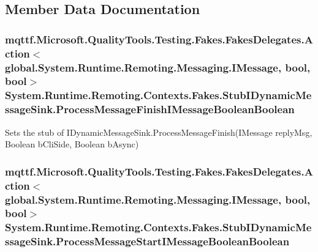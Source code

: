 \subsection{Member Data Documentation}
\hypertarget{class_system_1_1_runtime_1_1_remoting_1_1_contexts_1_1_fakes_1_1_stub_i_dynamic_message_sink_a06da6edaec8621edfd6fde49ad38520b}{
\subsubsection[{Process\-Message\-Finish\-I\-Message\-Boolean\-Boolean}]{\setlength{\rightskip}{0pt plus 5cm}mqttf.\-Microsoft.\-Quality\-Tools.\-Testing.\-Fakes.\-Fakes\-Delegates.\-Action$<$global.\-System.\-Runtime.\-Remoting.\-Messaging.\-I\-Message, bool, bool$>$ System.\-Runtime.\-Remoting.\-Contexts.\-Fakes.\-Stub\-I\-Dynamic\-Message\-Sink.\-Process\-Message\-Finish\-I\-Message\-Boolean\-Boolean}}\label{class_system_1_1_runtime_1_1_remoting_1_1_contexts_1_1_fakes_1_1_stub_i_dynamic_message_sink_a06da6edaec8621edfd6fde49ad38520b}


Sets the stub of I\-Dynamic\-Message\-Sink.\-Process\-Message\-Finish(\-I\-Message reply\-Msg, Boolean b\-Cli\-Side, Boolean b\-Async)

\hypertarget{class_system_1_1_runtime_1_1_remoting_1_1_contexts_1_1_fakes_1_1_stub_i_dynamic_message_sink_a78dd3a17919c117902bc47dde4552ead}{
\subsubsection[{Process\-Message\-Start\-I\-Message\-Boolean\-Boolean}]{\setlength{\rightskip}{0pt plus 5cm}mqttf.\-Microsoft.\-Quality\-Tools.\-Testing.\-Fakes.\-Fakes\-Delegates.\-Action$<$global.\-System.\-Runtime.\-Remoting.\-Messaging.\-I\-Message, bool, bool$>$ System.\-Runtime.\-Remoting.\-Contexts.\-Fakes.\-Stub\-I\-Dynamic\-Message\-Sink.\-Process\-Message\-Start\-I\-Message\-Boolean\-Boolean}}\label{class_system_1_1_runtime_1_1_remoting_1_1_contexts_1_1_fakes_1_1_stub_i_dynamic_message_sink_a78dd3a17919c117902bc47dde4552ead}


